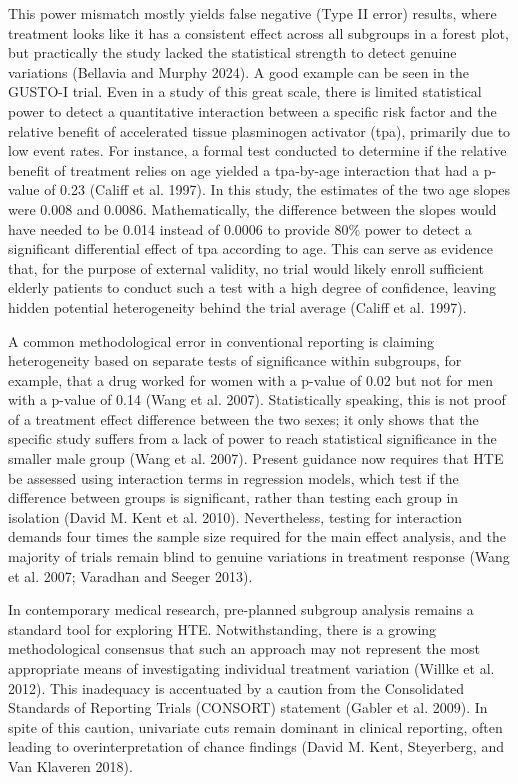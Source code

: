 \documentclass{article}
\begin{document}
This power mismatch mostly yields false negative (Type II error)
results, where treatment looks like it has a consistent effect across
all subgroups in a forest plot, but practically the study lacked the
statistical strength to detect genuine variations (Bellavia and Murphy
2024). A good example can be seen in the GUSTO-I trial. Even in a study
of this great scale, there is limited statistical power to detect a
quantitative interaction between a specific risk factor and the relative
benefit of accelerated tissue plasminogen activator (tpa), primarily due
to low event rates. For instance, a formal test conducted to determine
if the relative benefit of treatment relies on age yielded a tpa-by-age
interaction that had a p-value of 0.23 (Califf et al. 1997). In this
study, the estimates of the two age slopes were 0.008 and 0.0086.
Mathematically, the difference between the slopes would have needed to
be 0.014 instead of 0.0006 to provide 80\% power to detect a significant
differential effect of tpa according to age. This can serve as evidence
that, for the purpose of external validity, no trial would likely enroll
sufficient elderly patients to conduct such a test with a high degree of
confidence, leaving hidden potential heterogeneity behind the trial
average (Califf et al. 1997).

A common methodological error in conventional reporting is claiming
heterogeneity based on separate tests of significance within subgroups,
for example, that a drug worked for women with a p-value of 0.02 but not
for men with a p-value of 0.14 (Wang et al. 2007). Statistically
speaking, this is not proof of a treatment effect difference between the
two sexes; it only shows that the specific study suffers from a lack of
power to reach statistical significance in the smaller male group (Wang
et al. 2007). Present guidance now requires that HTE be assessed using
interaction terms in regression models, which test if the difference
between groups is significant, rather than testing each group in
isolation (David M. Kent et al. 2010). Nevertheless, testing for
interaction demands four times the sample size required for the main
effect analysis, and the majority of trials remain blind to genuine
variations in treatment response (Wang et al. 2007; Varadhan and Seeger
2013).

In contemporary medical research, pre-planned subgroup analysis remains
a standard tool for exploring HTE. Notwithstanding, there is a growing
methodological consensus that such an approach may not represent the
most appropriate means of investigating individual treatment variation
(Willke et al. 2012). This inadequacy is accentuated by a caution from
the Consolidated Standards of Reporting Trials (CONSORT) statement
(Gabler et al. 2009). In spite of this caution, univariate cuts remain
dominant in clinical reporting, often leading to overinterpretation of
chance findings (David M. Kent, Steyerberg, and Van Klaveren 2018).
\end{document}
